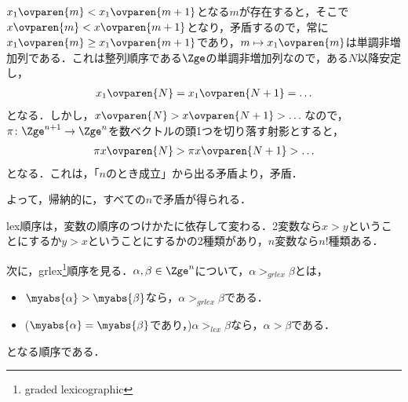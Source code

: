 \begin{myproof}
\begin{itemize}
\begin{itemize}
$x_1\ovparen{m}<x_1\ovparen{m+1}$となる$m$が存在すると，そこで$x\ovparen{m}<x\ovparen{m+1}$となり，矛盾するので，常に$x_1\ovparen{m}\ge x_1\ovparen{m+1}$であり，$m\mapsto x_1\ovparen{m}$は単調非増加列である．これは整列順序である$\Zge$の単調非増加列なので，ある$N$以降安定し，
\begin{align}
 x_1\ovparen{N} = x_1\ovparen{N+1} = \dots
\end{align}
となる．しかし，$x\ovparen{N}>x\ovparen{N+1}>\dots$なので，$\pi\colon \Zge^{n+1} \to \Zge^{n}$を数ベクトルの頭1つを切り落す射影とすると，
\begin{align}
 \pi x\ovparen{N} > \pi x\ovparen{N+1} > \dots
\end{align}
となる．これは，「$n$のとき成立」から出る矛盾より，矛盾．
\end{itemize}
よって，帰納的に，すべての$n$で矛盾が得られる．
 \end{itemize}
\end{myproof}

lex順序は，変数の順序のつけかたに依存して変わる．2変数なら$x>y$ということにするか$y>x$ということにするかの2種類があり，$n$変数なら$n!$種類ある．

次に，grlex\footnote{graded lexicographic}順序を見る．$\alpha,\beta \in \Zge^n$について，$\alpha >_{grlex} \beta$とは，
\begin{itemize}
 \item $\myabs{\alpha}>\myabs{\beta}$なら，$\alpha >_{grlex}\beta$である．
 \item ($\myabs{\alpha}=\myabs{\beta}$であり，)$\alpha >_{lex} \beta$なら，$\alpha > \beta$である．
\end{itemize}
となる順序である．

